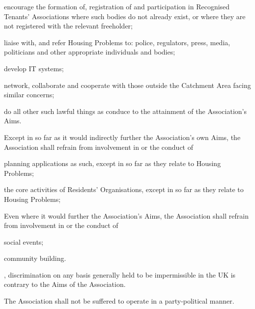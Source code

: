 \documentclass[10pt]{mk-articles-of-association}
\newcommand{\RA}[0]{Residents' Organisation}
\newcommand{\RTA}[0]{Recognised Tenants' Association}
\begin{document}
\begin{constenum}
\begin{constenum}
  \item encourage the formation of, registration of and participation
    in \RTA{}s where such bodies do not already exist, or where they
    are not registered with the relevant freeholder;

  \item liaise with, and refer Housing Problems to: police, regulators,
    press, media, politicians and other appropriate individuals and bodies;

  \item develop IT systems;

  \item network, collaborate and cooperate with those outside the
    Catchment Area facing similar concerns;

  \item do all other such lawful things as conduce to the attainment
    of the Association's Aims.
\end{constenum}

\item Except in so far as it would indirectly further the Association's own
  Aims, the Association shall refrain from involvement in or the conduct of
  \begin{constenum}
  \item planning applications as such, except in so far as they relate
    to Housing Problems;
  \item the core activities of \RA{}s, except in so far as they
    relate to Housing Problems;
  \end{constenum}

\item Even where it would further the Association's Aims, the Association
  shall refrain from involvement in or the conduct of
  \begin{constenum}
  \item social events; \ITand
  \item community building.
  \end{constenum}

\item \avoiddoubt, discrimination on any basis generally held to be
  impermissible in the UK is contrary to the Aims of the
  Association.

\item The Association shall not be suffered to operate in
  a party-political manner.

\end{constenum}
\end{document}
